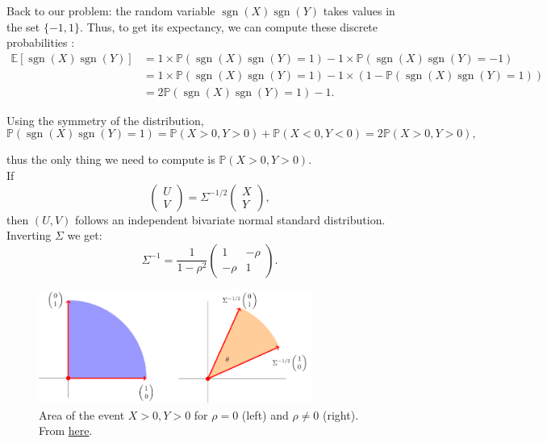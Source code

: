 Back to our problem: the random variable $\operatorname{sgn}(X)\operatorname{sgn}(Y)$ takes values in the set $\{-1,1\}$. Thus, to get its expectancy, we can compute these discrete probabilities :
\begin{align*}
    \mathbb{E}[\operatorname{sgn}(X)\operatorname{sgn}(Y)] &= 1\times \mathbb{P}(\operatorname{sgn}(X)\operatorname{sgn}(Y)=1) -1\times \mathbb{P}(\operatorname{sgn}(X)\operatorname{sgn}(Y)=-1)\\
    &= 1\times \mathbb{P}(\operatorname{sgn}(X)\operatorname{sgn}(Y)=1) -1\times (1-\mathbb{P}(\operatorname{sgn}(X)\operatorname{sgn}(Y)=1))\\
    &= 2\mathbb{P}(\operatorname{sgn}(X)\operatorname{sgn}(Y)=1) -1.
\end{align*}

Using the symmetry of the distribution, $$\mathbb{P}(\operatorname{sgn}(X)\operatorname{sgn}(Y)=1) = \mathbb{P}(X>0,Y>0) + \mathbb{P}(X<0,Y<0) = 2\mathbb{P}(X>0,Y>0),$$

thus the only thing we need to compute is $\mathbb{P}(X>0,Y>0)$.\\

If $$\begin{pmatrix}U\\V\end{pmatrix} = \Sigma^{-1/2}\begin{pmatrix}X\\Y\end{pmatrix},$$
then $(U,V)$ follows an independent bivariate normal standard distribution. Inverting $\Sigma$ we get:
$$\Sigma^{-1} = \frac1{1-\rho^2}\begin{pmatrix}
1 & -\rho\\ -\rho & 1
\end{pmatrix}.$$

\begin{figure}[H]
    \centering
    \includegraphics[width=0.8\textwidth]{images/corr_biv_normal.png}
    \caption{Area of the event $X>0,Y>0$ for $\rho = 0$ (left) and $\rho \ne 0$ (right). From \href{https://math.stackexchange.com/questions/1687795/correlated-joint-normal-distribution-calculating-a-probability}{here}.}
\end{figure}

